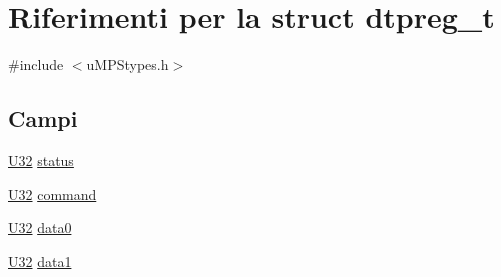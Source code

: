 \hypertarget{structdtpreg__t}{\section{Riferimenti per la struct dtpreg\-\_\-t}
\label{structdtpreg__t}
}


{\ttfamily \#include $<$u\-M\-P\-Stypes.\-h$>$}

\subsection*{Campi}
\begin{DoxyCompactItemize}
\item 
\hyperlink{lib_2base_8h_ac3df7cf3c8cb172a588adec881447d68}{U32} \hyperlink{structdtpreg__t_ae37efb991e613c0dc476ece5ed4ffa71}{status}
\item 
\hyperlink{lib_2base_8h_ac3df7cf3c8cb172a588adec881447d68}{U32} \hyperlink{structdtpreg__t_a8538fdce575b580097b18700c560a5a8}{command}
\item 
\hyperlink{lib_2base_8h_ac3df7cf3c8cb172a588adec881447d68}{U32} \hyperlink{structdtpreg__t_a8a0c321ffd2847534bfd0bc849a972b4}{data0}
\item 
\hyperlink{lib_2base_8h_ac3df7cf3c8cb172a588adec881447d68}{U32} \hyperlink{structdtpreg__t_a6eef7e2e6f5e38b7d153e3f25d6fefb8}{data1}
\end{DoxyCompactItemize}



